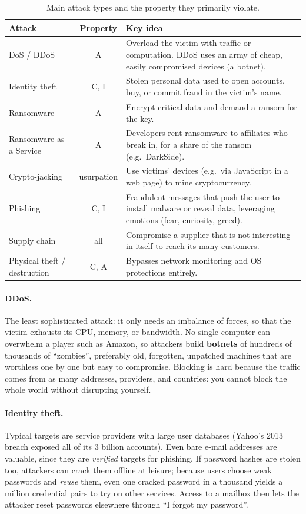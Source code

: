 \begin{table}[H]
\centering
\caption{Main attack types and the property they primarily violate.}
\label{tab:attack-examples}
\begin{tabularx}{\textwidth}{@{}l c X@{}}
\toprule
Attack & Property & Key idea \\
\midrule
DoS / DDoS & A & Overload the victim with traffic or computation. DDoS uses an army of cheap, easily compromised devices (a botnet). \\
Identity theft & C, I & Stolen personal data used to open accounts, buy, or commit fraud in the victim's name. \\
Ransomware & A & Encrypt critical data and demand a ransom for the key. \\
Ransomware as a Service & A & Developers rent ransomware to affiliates who break in, for a share of the ransom (e.g.\ DarkSide). \\
Crypto-jacking & usurpation & Use victims' devices (e.g.\ via JavaScript in a web page) to mine cryptocurrency. \\
Phishing & C, I & Fraudulent messages that push the user to install malware or reveal data, leveraging emotions (fear, curiosity, greed). \\
Supply chain & all & Compromise a supplier that is not interesting in itself to reach its many customers. \\
Physical theft / destruction & C, A & Bypasses network monitoring and OS protections entirely. \\
\bottomrule
\end{tabularx}
\end{table}

\paragraph{DDoS.} The least sophisticated attack: it only needs an imbalance of forces, so that the victim exhausts its CPU, memory, or bandwidth. No single computer can overwhelm a player such as Amazon, so attackers build \textbf{botnets} of hundreds of thousands of \enquote{zombies}, preferably old, forgotten, unpatched machines that are worthless one by one but easy to compromise. Blocking is hard because the traffic comes from as many addresses, providers, and countries: you cannot block the whole world without disrupting yourself.

\paragraph{Identity theft.} Typical targets are service providers with large user databases (Yahoo's 2013 breach exposed all of its 3 billion accounts). Even bare e-mail addresses are valuable, since they are \emph{verified} targets for phishing. If password hashes are stolen too, attackers can crack them offline at leisure; because users choose weak passwords and \emph{reuse} them, even one cracked password in a thousand yields a million credential pairs to try on other services. Access to a mailbox then lets the attacker reset passwords elsewhere through \enquote{I forgot my password}.

